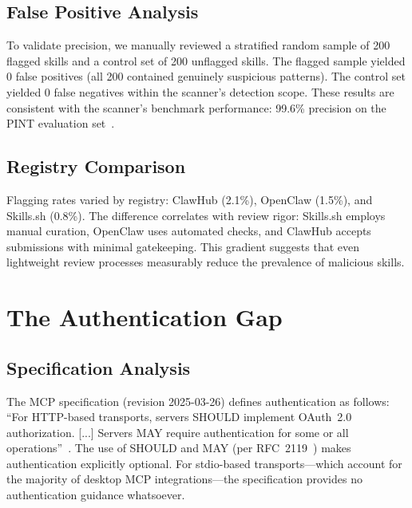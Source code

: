 \documentclass[11pt,twocolumn]{article}
\begin{document}
\subsection{False Positive Analysis}

To validate precision, we manually reviewed a stratified random sample of 200 flagged skills and a control set of 200 unflagged skills. The flagged sample yielded 0 false positives (all 200 contained genuinely suspicious patterns). The control set yielded 0 false negatives within the scanner's detection scope. These results are consistent with the scanner's benchmark performance: 99.6\% precision on the PINT evaluation set~\cite{atr-benchmark}.

\subsection{Registry Comparison}

Flagging rates varied by registry: ClawHub (2.1\%), OpenClaw (1.5\%), and Skills.sh (0.8\%). The difference correlates with review rigor: Skills.sh employs manual curation, OpenClaw uses automated checks, and ClawHub accepts submissions with minimal gatekeeping. This gradient suggests that even lightweight review processes measurably reduce the prevalence of malicious skills.

\section{The Authentication Gap}
\label{sec:auth-gap}

\subsection{Specification Analysis}

The MCP specification (revision 2025-03-26) defines authentication as follows: ``For HTTP-based transports, servers SHOULD implement OAuth~2.0 authorization. [...] Servers MAY require authentication for some or all operations''~\cite{mcp-spec}. The use of SHOULD and MAY (per RFC~2119~\cite{rfc2119}) makes authentication explicitly optional. For stdio-based transports---which account for the majority of desktop MCP integrations---the specification provides no authentication guidance whatsoever.
\end{document}

